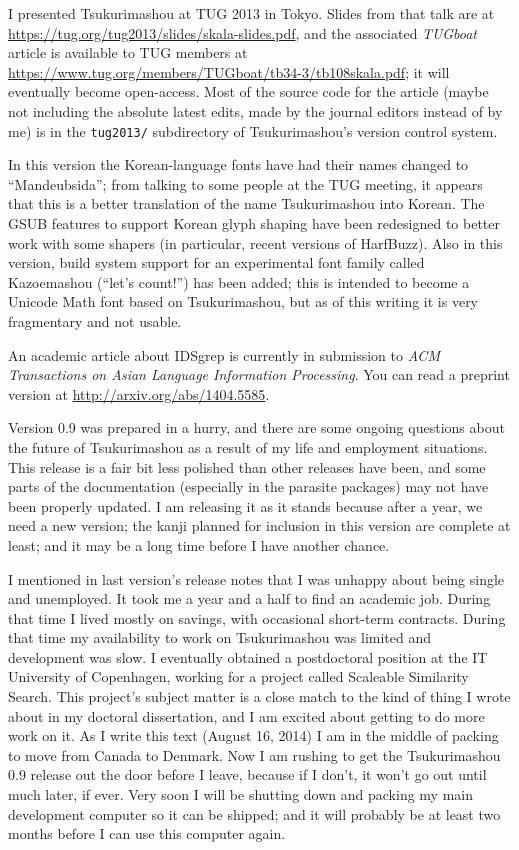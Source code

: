 \documentclass[14pt]{extarticle}
\begin{document}
I presented Tsukurimashou at TUG 2013 in Tokyo.  Slides from that talk are
at \url{https://tug.org/tug2013/slides/skala-slides.pdf}, and the associated
\emph{TUGboat} article is available to TUG members at
\url{https://www.tug.org/members/TUGboat/tb34-3/tb108skala.pdf}; it will
eventually become open-access.  Most of the source code for the article
(maybe not including the absolute latest edits, made by the journal editors
instead of by me) is in the \texttt{tug2013/} subdirectory of
Tsukurimashou's version control system.

In this version the Korean-language fonts have had their names changed to
``Mandeubsida''; from talking to some people at the TUG meeting, it appears
that this is a better translation of the name Tsukurimashou into Korean. 
The GSUB features to support Korean glyph shaping have been redesigned to
better work with some shapers (in particular, recent versions of HarfBuzz).
Also in this version, build system support for an experimental font family
called Kazoemashou (``let's count!'') has been added; this is intended to
become a Unicode Math font based on Tsukurimashou, but as of this writing it
is very fragmentary and not usable.

An academic article about IDSgrep is currently in submission to \emph{ACM
Transactions on Asian Language Information Processing}.  You can read a
preprint version at \url{http://arxiv.org/abs/1404.5585}.

Version 0.9 was prepared in a hurry, and there are some ongoing questions
about the future of Tsukurimashou as a result of my life and employment
situations.  This release is a fair bit less polished than other releases
have been, and some parts of the documentation (especially in the parasite
packages) may not have been properly updated.  I am releasing it as it
stands because after a year, we need a new version; the kanji planned for
inclusion in this version are complete at least; and it may be a long time
before I have another chance.

I mentioned in last version's release notes that I was unhappy about being
single and unemployed.  It took me a year and a half to find an academic
job.  During that time I lived mostly on savings, with occasional
short-term contracts.  During that time my availability to work on
Tsukurimashou was limited and development was slow.  I eventually obtained a
postdoctoral position at the IT University of Copenhagen, working for a
project called Scaleable Similarity Search.  This project's subject matter
is a close match to the kind of thing I wrote about in my doctoral
dissertation, and I am excited about getting to do more work on it.  As I
write this text (August 16, 2014) I am in the middle of packing to move from
Canada to Denmark.  Now I am rushing to get the Tsukurimashou 0.9 release
out the door before I leave, because if I don't, it won't go out until much
later, if ever.  Very soon I will be shutting down and packing my main
development computer so it can be shipped; and it will probably be at least
two months before I can use this computer again.
\end{document}
